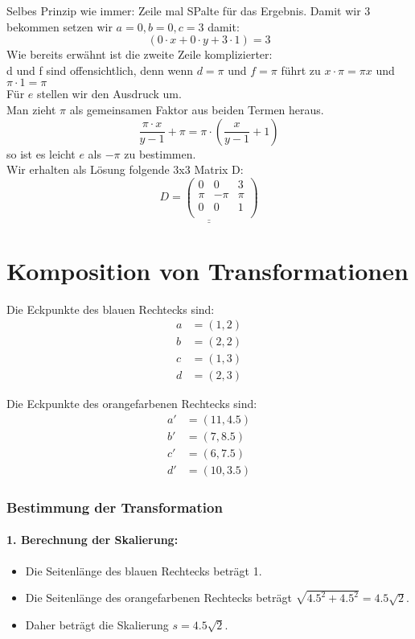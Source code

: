 \documentclass{article}
\begin{document}
Selbes Prinzip wie immer: Zeile mal SPalte für das Ergebnis.
Damit wir 3 bekommen setzen wir $a=0, b=0, c=3$ damit:
$$
(0 \cdot x + 0 \cdot y + 3 \cdot 1) = 3
$$
Wie bereits erwähnt ist die zweite Zeile komplizierter:\\
d und f sind offensichtlich, denn wenn $d = \pi$ und $f = \pi$ führt zu $x \cdot \pi = \pi x$ und $\pi \cdot 1 = \pi$\\
Für $e$ stellen wir den Ausdruck um.\\
Man zieht $\pi$ als gemeinsamen Faktor aus beiden Termen heraus.
$$
\frac{\pi \cdot x}{y -1} + \pi = \pi \cdot \left( \frac{x}{y -1} + 1 \right)
$$
so ist es leicht $e$ als $-\pi$ zu bestimmen.\\
Wir erhalten als Lösung folgende 3x3 Matrix D:
$$
\underline{\underline{
    D =
    \begin{pmatrix}
        0 & 0 & 3 \\
        \pi & -\pi & \pi \\
        0 & 0 & 1 \\
    \end{pmatrix}
}}
$$
\section{Komposition von Transformationen}
Die Eckpunkte des blauen Rechtecks sind:
\begin{align*}
a &= (1, 2) \\
b &= (2, 2) \\
c &= (1, 3) \\
d &= (2, 3)
\end{align*}

Die Eckpunkte des orangefarbenen Rechtecks sind:
\begin{align*}
a' &= (11, 4.5) \\
b' &= (7, 8.5) \\
c' &= (6, 7.5) \\
d' &= (10, 3.5)
\end{align*}

\subsubsection*{Bestimmung der Transformation}

\paragraph{1. Berechnung der Skalierung:}
\begin{itemize}
    \item Die Seitenlänge des blauen Rechtecks beträgt 1.
    \item Die Seitenlänge des orangefarbenen Rechtecks beträgt \( \sqrt{4.5^2 + 4.5^2} = 4.5\sqrt{2} \).
    \item Daher beträgt die Skalierung \( s = 4.5\sqrt{2} \).
\end{itemize}
\end{document}
